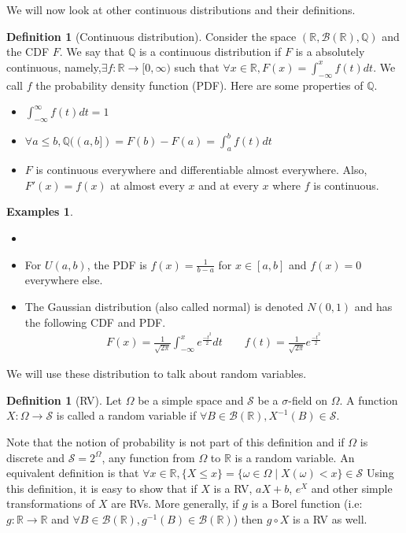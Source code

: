 \documentclass[paper=a4, fontsize=12pt]{scrartcl} %
\theoremstyle{definition}
\newtheorem{defn}[thm]{Definition}
\newtheorem{exmps}[thm]{Examples}
\theoremstyle{remark}
\newcommand{\R}{\mathbb{R}}
\newcommand{\Q}{\mathbb{Q}}
\newcommand{\borel}{\mathcal{B}(\R)}
\newcommand{\mS}{\mathcal{S}}
\numberwithin{equation}{section} %
\numberwithin{figure}{section} %
\numberwithin{table}{section} %
\begin{document}
We will now look at other continuous distributions and their definitions.
\begin{defn}[Continuous distribution]
	Consider the space $(\R, \mathcal{B}(\R), \Q)$ and the CDF $F$. We say that $\Q$ is a continuous distribution if $F$ is a absolutely continuous, namely,$\exists f : \R \rightarrow [0,\infty)$ such that $\forall x \in \R, F(x) = \int_{-\infty}^{x}f(t)dt$. We call $f$ the probability density function (PDF). Here are some properties of $\Q$.
	\begin{itemize}
		\item $\int_{-\infty}^{\infty}f(t)dt = 1$
		\item $\forall a \leq b, \Q((a,b]) = F(b)-F(a) = \int_a^bf(t)dt$
		\item $F$ is continuous everywhere and differentiable almost everywhere. Also, $F'(x) = f(x)$ at almost every $x$ and at every $x$ where $f$ is continuous.
	\end{itemize}
\end{defn}
\begin{exmps}
	\begin{itemize}\item[]
		\item For $U(a,b)$, the PDF is $f(x) = \frac{1}{b-a}$ for $x \in [a,b]$ and $f(x) = 0$ everywhere else.
		\item The Gaussian distribution (also called normal) is denoted $N(0,1)$ and has the following CDF and PDF.
		\begin{align*}
		F(x) = \frac{1}{\sqrt{2\pi}}\int_{-\infty}^xe^{\frac{-t^2}{2}}dt \quad \quad f(t) = \frac{1}{\sqrt{2\pi}}e^{\frac{-t^2}{2}}
		\end{align*}
	\end{itemize}
\end{exmps}
We will use these distribution to talk about random variables.
\begin{defn}[RV]
	Let $\Omega$ be a simple space and $\mS$ be a $\sigma$-field on $\Omega$. A function $X : \Omega \rightarrow \mS$ is called a random variable if $\forall B \in \mathcal{B}(\R), X^{-1}(B) \in \mS$.
\end{defn}
Note that the notion of probability is not part of this definition and if $\Omega$ is discrete and $\mS = 2^{\Omega}$, any function from $\Omega$ to $\R$ is a random variable. An equivalent definition is that $\forall x \in \R, \{X \leq x\} = \{\omega \in \Omega \mid X(\omega) < x\} \in \mS$ Using this definition, it is easy to show that if $X$ is a RV, $aX + b$, $e^X$ and other simple transformations of $X$ are RVs. More generally, if $g$ is a Borel function (i.e: $g: \R \rightarrow \R$ and $\forall B \in \mathcal{B}(\R), g^{-1}(B) \in \borel$) then $g \circ X$ is a RV as well.
\end{document}
